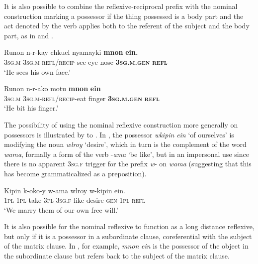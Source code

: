 \documentclass[output=paper]{langscibook}
\begin{document}
         

  It is also possible to combine the reflexive-reciprocal prefix with the nominal construction marking a possessor if the thing possessed is a body part and the act denoted by the verb applies both to the referent of the subject and the body part, as in  and .





\ea%
    \label{ex:Brown:54}
    \gll Runon  n-r-kay  chkuel  nyamayki  \textbf{mnon}  \textbf{ein.}\\
 \textsc{3sg.m}  \textsc{3sg.m-refl/recip}{}-see  eye  nose  \textbf{\textsc{3sg.m.gen}}  \textbf{\textsc{refl}}\\
    \glt ‘He sees his own face.’
    \z

        
\ea%
    \label{ex:Brown:55}
    \gll Runon  n-r-ako  motu  \textbf{mnon}  \textbf{ein}\\
 \textsc{3sg.m}  \textsc{3sg.m}{}-\textsc{refl/recip}{}-eat  finger  \textbf{\textsc{3sg.m.gen}}  \textbf{\textsc{refl}}\\
    \glt   ‘He bit his finger.’
    \z


  The possibility of using the nominal reflexive construction more generally on possessors is illustrated by  to . In , the possessor \emph{wkipin} \emph{ein} ‘of ourselves’ is modifying the noun \emph{wlroy} ‘desire’, which in turn is the complement of the word \emph{wama}, formally a form of the verb -\emph{ama} ‘be like’, but in an impersonal use since there is no apparent \textsc{3sg.f} trigger for the prefix \emph{w}{}- on \emph{wama} (suggesting that this has become grammaticalized as a preposition).



\ea%
    \label{ex:Brown:56}
    \gll Kipin  k-oko-y  w-ama  wlroy  w-kipin  ein.\\
 \textsc{1pl}  \textsc{1pl}{}-take-\textsc{3pl}  \textsc{3sg.f}{}-like  desire  \textsc{gen}{}-\textsc{1pl}  \textsc{refl}\\
    \glt ‘We marry them of our own free will.’
    \z

    
  It is also possible for the nominal reflexive to function as a long distance reflexive, but only if it is a possessor in a subordinate clause, coreferential with the subject of the matrix clause. In , for example, \emph{mnon} \emph{ein} is the possessor of the object in the subordinate clause but refers back to the subject of the matrix clause.
\end{document}
